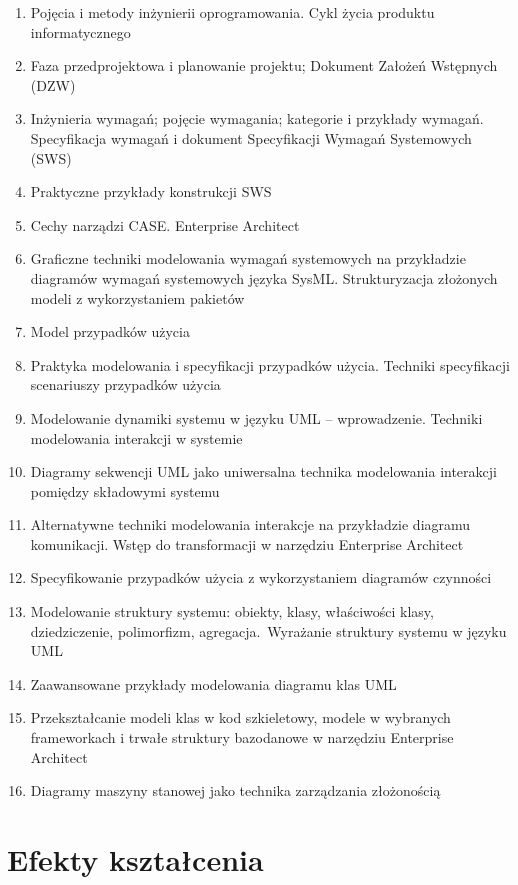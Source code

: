 \documentclass[12pt, a4paper]{article}
\begin{document}
\begin{enumerate}
  \item Pojęcia i metody inżynierii oprogramowania. Cykl życia produktu informatycznego
  \item Faza przedprojektowa i planowanie projektu; Dokument Założeń Wstępnych (DZW)
  \item Inżynieria wymagań; pojęcie wymagania; kategorie i przykłady wymagań. Specyfikacja wymagań i dokument Specyfikacji Wymagań Systemowych (SWS)
  \item Praktyczne przykłady konstrukcji SWS
  \item Cechy narządzi CASE. Enterprise Architect
  \item Graficzne techniki modelowania wymagań systemowych na przykładzie diagramów wymagań systemowych języka SysML. Strukturyzacja złożonych modeli z wykorzystaniem pakietów
  \item Model przypadków użycia
  \item Praktyka modelowania i specyfikacji przypadków użycia. Techniki specyfikacji scenariuszy przypadków użycia
  \item Modelowanie dynamiki systemu w języku UML – wprowadzenie. Techniki modelowania interakcji w systemie
  \item Diagramy sekwencji UML jako uniwersalna technika modelowania interakcji pomiędzy składowymi systemu
  \item Alternatywne techniki modelowania interakcje na przykładzie diagramu komunikacji. Wstęp do transformacji w narzędziu Enterprise Architect
  \item Specyfikowanie przypadków użycia z wykorzystaniem diagramów czynności
  \item Modelowanie struktury systemu: obiekty, klasy, właściwości klasy, dziedziczenie, polimorfizm, agregacja. Wyrażanie struktury systemu w języku UML
  \item Zaawansowane przykłady modelowania diagramu klas UML
  \item Przekształcanie modeli klas w kod szkieletowy, modele w wybranych frameworkach i trwałe struktury bazodanowe w narzędziu Enterprise Architect
  \item Diagramy maszyny stanowej jako technika zarządzania złożonością
\end{enumerate}

\section{Efekty kształcenia}
\end{document}
